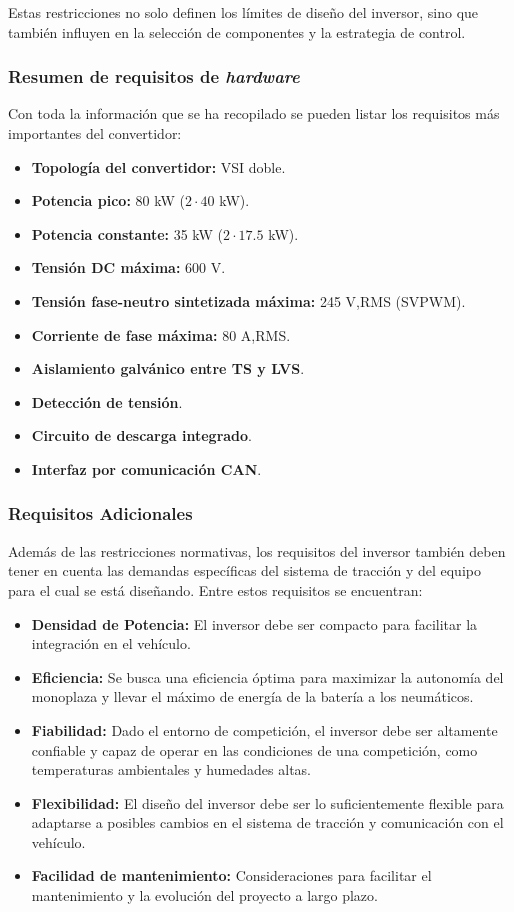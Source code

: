 Estas restricciones no solo definen los límites de diseño del inversor, sino que también influyen en la selección de componentes y la estrategia de control.

\subsubsection{Resumen de requisitos de \textit{hardware}}

Con toda la información que se ha recopilado se pueden listar los requisitos más importantes del convertidor:
\begin{itemize}
	\item \textbf{Topología del convertidor:} VSI doble.
	\item \textbf{Potencia pico:} 80 kW ($2\cdot40$ kW).
	\item \textbf{Potencia constante:} 35 kW ($2\cdot17.5$ kW).
	\item \textbf{Tensión DC máxima:} 600 V.
	\item \textbf{Tensión fase-neutro sintetizada máxima:} 245 V,RMS (SVPWM).
	\item \textbf{Corriente de fase máxima:} 80 A,RMS.
	\item \textbf{Aislamiento galvánico entre TS y LVS}.
	\item \textbf{Detección de tensión}.
	\item \textbf{Circuito de descarga integrado}.
	\item \textbf{Interfaz por comunicación CAN}.
	
	
\end{itemize}

\subsubsection{Requisitos Adicionales}
Además de las restricciones normativas, los requisitos del inversor también deben tener en cuenta las demandas específicas del sistema de tracción y del equipo para el cual se está diseñando. Entre estos requisitos se encuentran:

\begin{itemize}
	\item \textbf{Densidad de Potencia:} El inversor debe ser compacto para facilitar la integración en el vehículo.
	\item \textbf{Eficiencia:} Se busca una eficiencia óptima para maximizar la autonomía del monoplaza y llevar el máximo de energía de la batería a los neumáticos.
	\item \textbf{Fiabilidad:} Dado el entorno de competición, el inversor debe ser altamente confiable y capaz de operar en las condiciones de una competición, como temperaturas ambientales y humedades altas.
	\item \textbf{Flexibilidad:} El diseño del inversor debe ser lo suficientemente flexible para adaptarse a posibles cambios en el sistema de tracción y comunicación con el vehículo.
	\item \textbf{Facilidad de mantenimiento:} Consideraciones para facilitar el mantenimiento y la evolución del proyecto a largo plazo.
\end{itemize}

